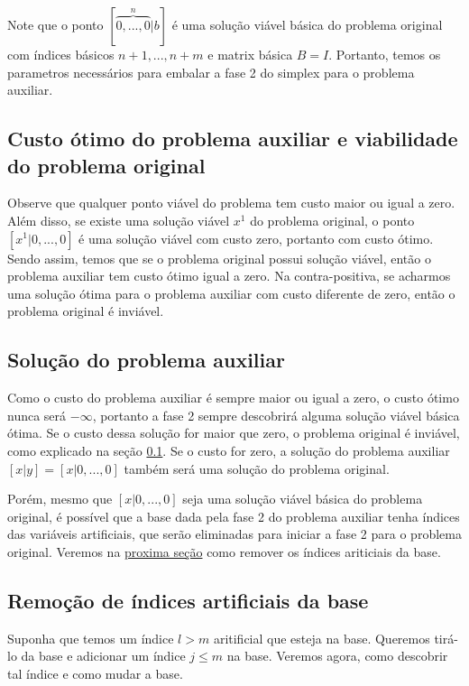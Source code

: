 \documentclass[12pt]{article}
\begin{document}
Note que o ponto $[\overbrace{0, ..., 0}^{n}|b]$ é uma solução viável básica do problema original com índices básicos $n + 1, ..., n + m$ e matrix básica $B = I$. Portanto, temos os parametros necessários para embalar a fase 2 do simplex para o problema auxiliar.



\subsection{Custo ótimo do problema auxiliar e viabilidade do problema original}
\label{fase2:custo_otimo}
Observe que qualquer ponto viável do problema tem custo maior ou igual a zero. Além disso, se existe uma solução viável $x^1$ do problema original, o ponto $[x^1 | 0, ..., 0]$ é uma solução viável com custo zero, portanto com custo ótimo. Sendo assim, temos que se o problema original possui solução viável, então o problema auxiliar tem custo ótimo igual a zero. Na contra-positiva, se acharmos uma solução ótima para o problema auxiliar com custo diferente de zero, então o problema original é inviável.


\subsection{Solução do problema auxiliar}
Como o custo do problema auxiliar é sempre maior ou igual a zero, o custo ótimo nunca será $-\infty$, portanto a fase 2 sempre descobrirá alguma solução viável básica ótima. Se o custo dessa solução for maior que zero, o problema original é inviável, como explicado na seção \ref{fase2:custo_otimo}. Se o custo for zero, a solução do problema auxiliar $[x|y] = [x | 0, ..., 0]$ também será uma solução do problema original. 

Porém, mesmo que $[x | 0, ..., 0]$ seja uma solução viável básica do problema original, é possível que a base dada pela fase 2 do problema auxiliar tenha índices das variáveis artificiais, que serão eliminadas para iniciar a fase 2 para o problema original. Veremos na \hyperref[rm_artificiais]{proxima seção} como remover os índices ariticiais da base.

\subsection{Remoção de índices artificiais da base}
\label{fase2:rm_artificiais}
Suponha que temos um índice $l > m$ aritificial que esteja na base. Queremos tirá-lo da base e adicionar um índice $j \leq m$ na base. Veremos agora, como descobrir tal índice e como mudar a base.
\end{document}
